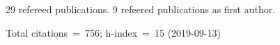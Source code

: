 29 refereed publications. 9 refeered publications as first author.

Total citations~=~756; h-index~=~15 (2019-09-13)